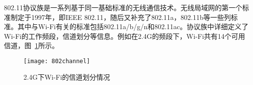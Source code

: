 802.11协议族是一系列基于同一基础标准的无线通信技术。无线局域网的第一个标准制定于1997年，即IEEE 802.11，随后又补充了802.11a，802.11b等一些列标准。其中与Wi-Fi有关的标准包括802.11a/b/g/n和802.11ac。协议族中详细定义了Wi-Fi的工作频段，信道划分等信息。例如在2.4G的频段下，Wi-Fi共有14个可用信道，图~\ref{fig:802channel}所示。
\begin{figure}[htbp] %
  \centering
  \texttt{[image: 802channel]}
  \caption{2.4G下Wi-Fi的信道划分情况}
  \label{fig:802channel}
\end{figure}























